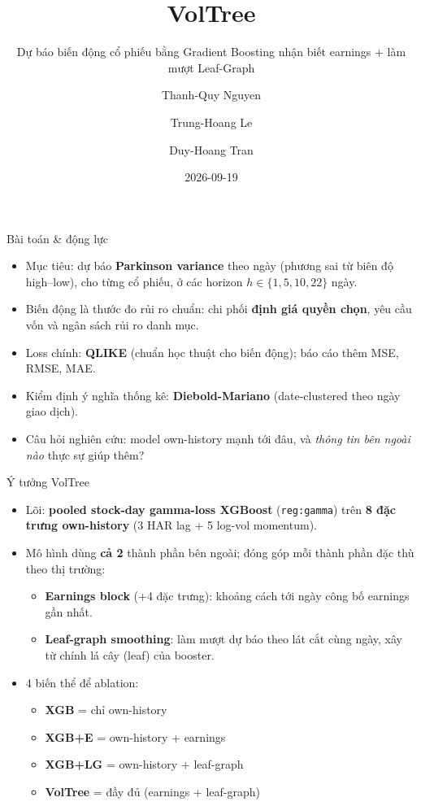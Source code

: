 \documentclass[aspectratio=169]{beamer}
\title{VolTree}
\subtitle{Dự báo biến động cổ phiếu bằng Gradient Boosting nhận biết earnings + làm mượt Leaf-Graph}
\author{Thanh-Quy Nguyen \and Trung-Hoang Le \and Duy-Hoang Tran}
\institute{University of Science, VNU-HCM \\ \textit{Tóm tắt bài báo khoa học}}
\date{2026-09-19}
\begin{document}
\begin{frame}
  \titlepage
\end{frame}

\begin{frame}{Bài toán \& động lực}
  \begin{itemize}
    \item Mục tiêu: dự báo \textbf{Parkinson variance} theo ngày (phương sai từ biên độ high--low), cho từng cổ phiếu, ở các horizon $h \in \{1,5,10,22\}$ ngày.
    \item Biến động là thước đo rủi ro chuẩn: chi phối \textbf{định giá quyền chọn}, yêu cầu vốn và ngân sách rủi ro danh mục.
    \item Loss chính: \textbf{QLIKE} (chuẩn học thuật cho biến động); báo cáo thêm MSE, RMSE, MAE.
    \item Kiểm định ý nghĩa thống kê: \textbf{Diebold-Mariano} (date-clustered theo ngày giao dịch).
    \item Câu hỏi nghiên cứu: model own-history mạnh tới đâu, và \emph{thông tin bên ngoài nào} thực sự giúp thêm?
  \end{itemize}
\end{frame}

\begin{frame}{Ý tưởng VolTree}
  \begin{itemize}
    \item Lõi: \textbf{pooled stock-day gamma-loss XGBoost} (\texttt{reg:gamma}) trên \textbf{8 đặc trưng own-history} (3 HAR lag + 5 log-vol momentum).
    \item Mô hình dùng \textbf{cả 2} thành phần bên ngoài; đóng góp mỗi thành phần đặc thù theo thị trường:
      \begin{itemize}
        \item \textbf{Earnings block} (+4 đặc trưng): khoảng cách tới ngày công bố earnings gần nhất.
        \item \textbf{Leaf-graph smoothing}: làm mượt dự báo theo lát cắt cùng ngày, xây từ chính lá cây (leaf) của booster.
      \end{itemize}
    \item 4 biến thể để ablation:
      \begin{itemize}
        \item \textbf{XGB} = chỉ own-history
        \item \textbf{XGB+E} = own-history + earnings
        \item \textbf{XGB+LG} = own-history + leaf-graph
        \item \textbf{VolTree} = đầy đủ (earnings + leaf-graph)
      \end{itemize}
  \end{itemize}
\end{frame}
\end{document}
